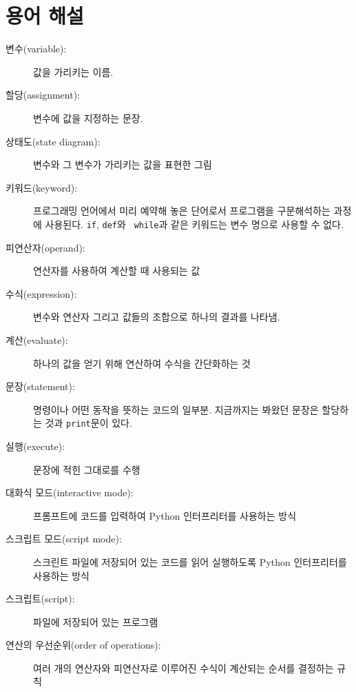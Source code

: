 \documentclass[10pt]{book}
\begin{document}
\section{용어 해설}

\begin{description}

\item[변수(variable):]  값을 가리키는 이름. 

\item[할당(assignment):]  변수에 값을 지정하는 문장. 

\item[상태도(state diagram):]  변수와 그 변수가 가리키는 값을 표현한 그림

\item[키워드(keyword):] 프로그래밍 언어에서 미리 예약해 놓은 단어로서
  프로그램을 구문해석하는 과정에 사용된다.  {\tt if}, {\tt def}와 {\tt
    while}과 같은 키워드는 변수 명으로 사용할 수 없다.

\item[피연산자(operand):]  연산자를 사용하여 계산할 때 사용되는 값

\item[수식(expression):] 변수와 연산자 그리고 값들의 조합으로 하나의
  결과를 나타냄.

\item[계산(evaluate):]  하나의 값을 얻기 위해 연산하여 수식을 간단화하는 것

\item[문장(statement):] 명령이나 어떤 동작을 뜻하는 코드의 일부분.
  지금까지는 봐왔던 문장은 할당하는 것과 \texttt{print}문이 있다.

\item[실행(execute):]  문장에 적힌 그대로를 수행

\item[대화식 모드(interactive mode):] 프롬프트에 코드를 입력하여
  Python 인터프리터를 사용하는 방식

\item[스크립트 모드(script mode):] 스크린트 파일에 저장되어 있는 코드를
  읽어 실행하도록 Python 인터프리터를 사용하는 방식

\item[스크립트(script):] 파일에 저장되어 있는 프로그램

\item[연산의 우선순위(order of operations):] 여러 개의 연산자와
  피연산자로 이루어진 수식이 계산되는 순서를 결정하는 규칙


\end{description}
\end{document}
